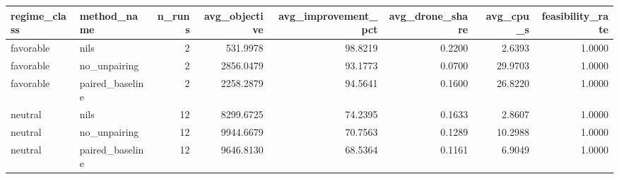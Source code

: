 \begin{tabular}{llrrrrrr}
\toprule
regime_class & method_name & n_runs & avg_objective & avg_improvement_pct & avg_drone_share & avg_cpu_s & feasibility_rate \\
\midrule
favorable & nils & 2 & 531.9978 & 98.8219 & 0.2200 & 2.6393 & 1.0000 \\
favorable & no_unpairing & 2 & 2856.0479 & 93.1773 & 0.0700 & 29.9703 & 1.0000 \\
favorable & paired_baseline & 2 & 2258.2879 & 94.5641 & 0.1600 & 26.8220 & 1.0000 \\
neutral & nils & 12 & 8299.6725 & 74.2395 & 0.1633 & 2.8607 & 1.0000 \\
neutral & no_unpairing & 12 & 9944.6679 & 70.7563 & 0.1289 & 10.2988 & 1.0000 \\
neutral & paired_baseline & 12 & 9646.8130 & 68.5364 & 0.1161 & 6.9049 & 1.0000 \\
\bottomrule
\end{tabular}
